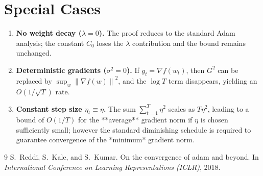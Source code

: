 \documentclass{article}
\newcommand{\norm}[1]{\left\|#1\right\|}
\begin{document}
\section*{Special Cases}
\begin{enumerate}[nosep]
\item \textbf{No weight decay ($\lambda=0$).}  The proof reduces to the standard Adam analysis; the constant $C_{0}$ loses the $\lambda$ contribution and the bound remains unchanged.
\item \textbf{Deterministic gradients ($\sigma^{2}=0$).}  If $g_{t}=\nabla f(w_{t})$, then $G^{2}$ can be replaced by $\sup_{w}\norm{\nabla f(w)}^{2}$, and the $\log T$ term disappears, yielding an $O(1/\sqrt{T})$ rate.
\item \textbf{Constant step size $\eta_{t}\equiv\eta$.}  The sum $\sum_{t=1}^{T}\eta^{2}$ scales as $T\eta^{2}$, leading to a bound of $O(1/T)$ for the **average** gradient norm if $\eta$ is chosen sufficiently small; however the standard diminishing schedule is required to guarantee convergence of the *minimum* gradient norm.
\end{enumerate}


\begin{thebibliography}{9}
S.~Reddi, S.~Kale, and S.~Kumar.
\newblock On the convergence of adam and beyond.
\newblock In \emph{International Conference on Learning Representations (ICLR)}, 2018.
\end{thebibliography}
\end{document}
